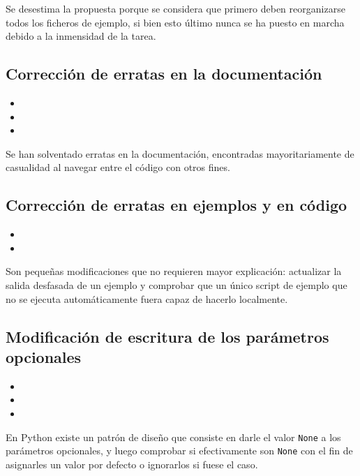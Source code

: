 Se desestima la propuesta porque se considera que primero deben reorganizarse todos los ficheros de ejemplo, si bien esto último nunca se ha puesto en marcha debido a la inmensidad de la tarea.

\subsection{Corrección de erratas en la documentación}

\begin{itemize}
    \item {}
    \item {}
    \item {}
\end{itemize}

Se han solventado erratas en la documentación, encontradas mayoritariamente de casualidad al navegar entre el código con otros fines.

\subsection{Corrección de erratas en ejemplos y en código}

\begin{itemize}
    \item {}
    \item {}
\end{itemize}

Son pequeñas modificaciones que no requieren mayor explicación: actualizar la salida desfasada de un ejemplo y comprobar que un único script de ejemplo que no se ejecuta automáticamente fuera capaz de hacerlo localmente.

\subsection{Modificación de escritura de los parámetros opcionales}

\begin{itemize}
    \item {}
    \item {}
    \item {}
\end{itemize}

En Python existe un patrón de diseño que consiste en darle el valor \texttt{None} a los parámetros opcionales, y luego comprobar si efectivamente son \texttt{None} con el fin de asignarles un valor por defecto o ignorarlos si fuese el caso.

